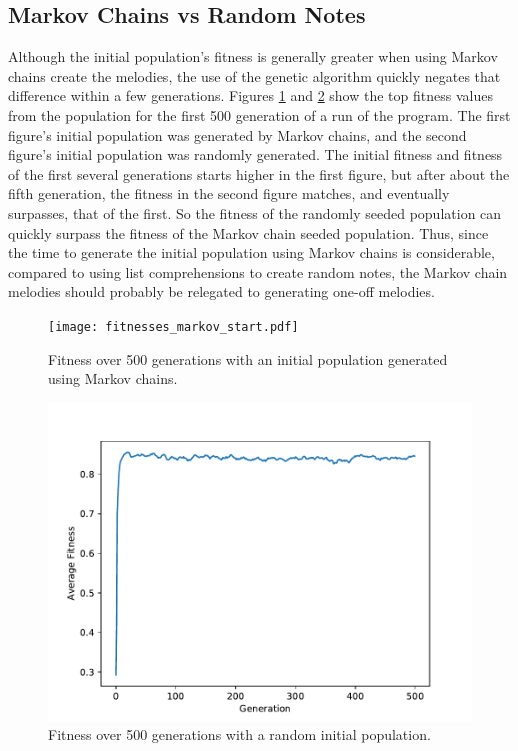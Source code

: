 \subsection{Markov Chains vs Random Notes}
Although the initial population's fitness is generally greater when using Markov chains create the melodies, the use of the genetic algorithm quickly negates that difference within a few generations.
Figures \ref{fig:fitness_markov} and \ref{fig:fitness:random} show the top fitness values from the population for the first 500 generation of a run of the program.
The first figure's initial population was generated by Markov chains, and the second figure's initial population was randomly generated.
The initial fitness and fitness of the first several generations starts higher in the first figure, but after about the fifth generation, the fitness in the second figure matches, and eventually surpasses, that of the first.
So the fitness of the randomly seeded population can quickly surpass the fitness of the Markov chain seeded population.
Thus, since the time to generate the initial population using Markov chains is considerable, compared to using list comprehensions to create random notes, the Markov chain melodies should probably be relegated to generating one-off melodies.

\begin{figure}[h]
	\centering
	\texttt{[image: fitnesses\_markov\_start.pdf]}
	\caption{Fitness over 500 generations with an initial population generated using Markov chains.}
	\label{fig:fitness_markov}
\end{figure}

\begin{figure}[h]
	\centering
	\includegraphics[width=\linewidth]{figures/fitnesses_random_start.pdf}
	\caption{Fitness over 500 generations with a random initial population.}
	\label{fig:fitness:random}
\end{figure}

